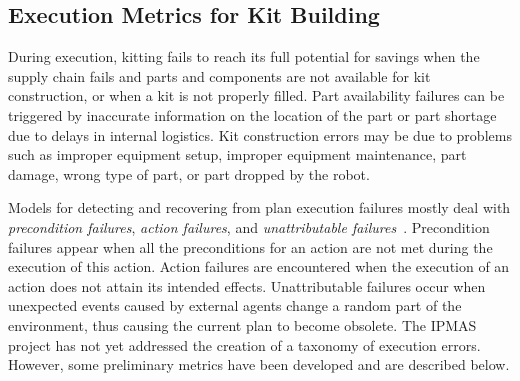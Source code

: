 \subsection{Execution Metrics for Kit Building}
During execution, kitting fails to reach its full potential for savings when the supply chain fails and parts and components are not available for kit construction, or when a kit is not properly filled. Part availability failures can be triggered by inaccurate information on the location of the part or part shortage due to delays in internal logistics. Kit construction errors may be due to problems such as improper equipment setup, improper equipment maintenance, part damage, wrong type of part, or part dropped by the robot.


Models for detecting and recovering from plan execution failures mostly deal with \textit{precondition failures}, \textit{action failures}, and \textit{unattributable failures}~\cite{Myers1998}. Precondition failures appear when all the preconditions for an action are not met during the execution of this action. Action failures are encountered when the execution of an action does not attain its intended effects. Unattributable failures occur when unexpected events caused by external agents change a random part of the environment, thus causing the current plan to become obsolete. The IPMAS project has not yet addressed the creation of a taxonomy of  execution errors. However, some preliminary metrics have been developed and are described
below.

